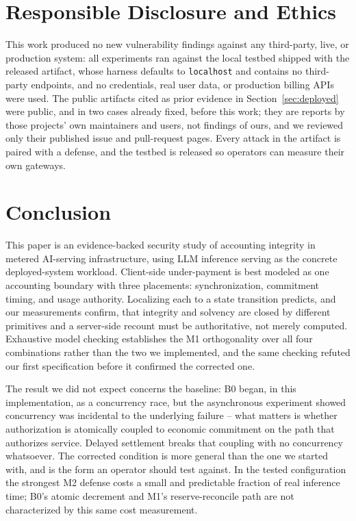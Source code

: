 \documentclass[manuscript,review,anonymous]{acmart}
\begin{document}
\section{Responsible Disclosure and Ethics}
This work produced no new vulnerability findings against any third-party, live, or
production system: all experiments ran against the local testbed shipped with the
released artifact, whose harness defaults to \texttt{localhost} and contains no
third-party endpoints, and no credentials, real user data, or production billing APIs
were used. The public artifacts cited as prior evidence in Section~\ref{sec:deployed}
were public, and in two cases already fixed, before this work; they are reports by those
projects' own maintainers and users, not findings of ours, and we reviewed only their
published issue and pull-request pages. Every attack in the artifact is paired with a
defense, and the testbed is released so operators can measure their own gateways.

\section{Conclusion}
This paper is an evidence-backed security study of accounting integrity in metered
AI-serving infrastructure, using LLM inference serving as the concrete deployed-system
workload. Client-side under-payment
is best modeled as one accounting boundary with three placements: synchronization,
commitment timing, and usage authority. Localizing each to a state transition predicts,
and our measurements confirm, that integrity and solvency are closed by different
primitives and a server-side recount must be authoritative, not merely computed.
Exhaustive model checking establishes
the M1 orthogonality over all four combinations rather than the two we implemented, and
the same checking refuted our first specification before it confirmed the corrected one.

The result we did not expect concerns the baseline: B0 began, in this implementation, as
a concurrency race, but the asynchronous experiment showed concurrency was incidental to
the underlying failure -- what matters is whether authorization is atomically coupled to
economic commitment on the path that authorizes service. Delayed settlement breaks that
coupling with no concurrency whatsoever. The corrected condition is more general than the
one we started with, and is the form an operator should test against. In the tested configuration the strongest M2 defense costs a small and
predictable fraction of real inference time; B0's atomic decrement and M1's
reserve-reconcile path are not characterized by this same cost measurement.
\end{document}
